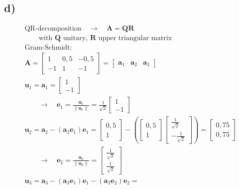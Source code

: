 \subsection*{d)}
\begin{align*}
	&\text{QR-decomposition}\quad\rightarrow\quad\mathbf{A=QR}& \\
	&\qquad\text{with $\mathbf{Q}$ unitary, $\mathbf{R}$ upper triangular matrix}& \\
	&\text{Gram-Schmidt:}& \\
	&\mathbf{A}=
	\begin{bmatrix}
	1 & 0,5 & -0,5 \\
	-1 & 1 & -1 
	\end{bmatrix}=\begin{bmatrix}\mathbf{a}_{1}&\mathbf{a}_{2}&\mathbf{a}_{3}\end{bmatrix}& \\
	&\mathbf{u}_{1}=\mathbf{a}_{1}=\begin{bmatrix}1\\-1\end{bmatrix}& \\
	&\qquad\rightarrow\quad\mathbf{e}_{1}=\frac{\mathbf{u}_{1}}{\|\mathbf{u}_{1}\|}=\frac{1}{\sqrt{2}}\begin{bmatrix}1\\-1\end{bmatrix}& \\
	&\mathbf{u}_{2}=\mathbf{a}_{2}-\left(\mathbf{a}_{2}\mathbf{e}_{1}\right)\mathbf{e}_{1}=\begin{bmatrix}0,5\\1\end{bmatrix}-\left(\begin{bmatrix}0,5\\1\end{bmatrix}\begin{bmatrix}\frac{1}{\sqrt{2}}\\-\frac{1}{\sqrt{2}}\end{bmatrix}\right)=\begin{bmatrix}0,75\\0,75\end{bmatrix}& \\
	&\qquad\rightarrow\quad\mathbf{e}_{2}=\frac{\mathbf{u}_{2}}{\|\mathbf{u}_{2}\|}=\begin{bmatrix}\frac{1}{\sqrt{2}}\\\frac{1}{\sqrt{2}}\end{bmatrix}& \\
	&\mathbf{u}_{3}=\mathbf{a}_{3}-\left(\mathbf{a}_{3}\mathbf{e}_{1}\right)\mathbf{e}_{1}-\left(\mathbf{a}_{3}\mathbf{e}_{2}\right)\mathbf{e}_{2}=& \\

\end{align*}
